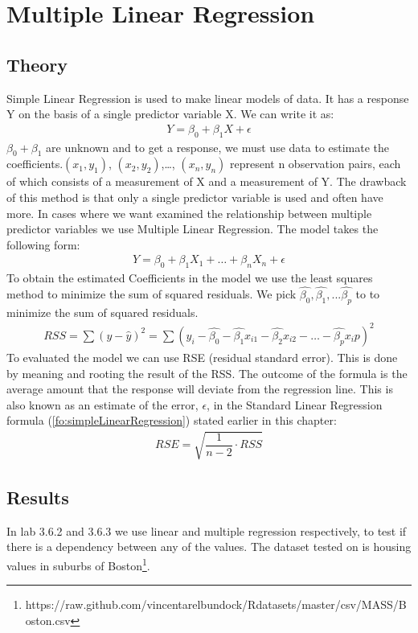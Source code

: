 \section{Multiple Linear Regression}\label{sc:multipleLinearRegression}

\subsection{Theory}
Simple Linear Regression is used to make linear models of data. It has a response Y on the basis of a single predictor variable X. We can write it as:
\begin{align}\label{fo:simpleLinearRegression}
Y = \beta_0 + \beta_1 X + \epsilon
\end{align}
$ \beta_0 + \beta_1 $ are unknown and to get a response, we must use data to estimate the coefficients.$(x_1, y_1)$, $(x_2, y_2)$,\dots, $(x_n, y_n)$ represent n observation pairs, each of which consists of a measurement of X and a measurement of Y. The drawback of this method is that only a single predictor variable is used and often have more.
 In cases where we want examined the relationship between multiple predictor variables we use Multiple Linear Regression. The model takes the following form:
\begin{align}\label{fo:multipleLinearRegression}
Y = \beta_0 + \beta_1 X_1 + \ldots + \beta_n X_n + \epsilon
\end{align}
To obtain the estimated Coefficients in the model we use the least squares method to minimize the sum of squared residuals. We pick $\hat{\beta_0}, \hat{\beta_1}, ... \hat{\beta_p}$ to to minimize the sum of squared residuals.
\begin{align}\label{fo:rss}
RSS = \sum (y - \hat{y})^2 = \sum( y_i - \hat{\beta_0} - \hat{\beta_1}x_{i1} - \hat{\beta_2}x_{i2} - \ldots - \hat{\beta_p}x_\textit{i}p )^2
\end{align}
To evaluated the model we can use RSE (residual standard error). This is done by meaning and rooting the result of the RSS. The outcome of the formula is the average amount that the response will deviate from the regression line. This is also known as an estimate of the error, $\epsilon$, in the Standard Linear Regression formula (\ref{fo:simpleLinearRegression}) stated earlier in this chapter:
\begin{align}\label{fo:rse}
RSE = \sqrt{\dfrac{1}{n-2}\cdot RSS}
\end{align}


\subsection{Results}
In lab 3.6.2 and 3.6.3 we use linear and multiple regression respectively, to test if there is a dependency between any of the values. The dataset tested on is housing values in suburbs of Boston\footnote{https://raw.github.com/vincentarelbundock/Rdatasets/master/csv/MASS/Boston.csv}.

